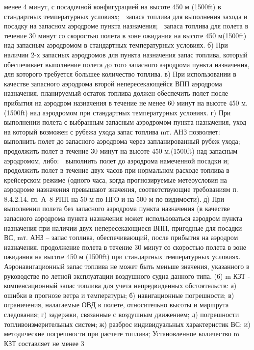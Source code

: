 менее 4 минут, с посадочной конфигурацией на высоте 450 м (1500ft) в стандартных температурных условиях;
	запаса топлива для выполнения захода и посадку на запасном аэродроме пункта назначения;
	запаса топлива для полета в течение 30 минут со скоростью полета в зоне ожидания на высоте 450 м(1500ft) над запасным аэродромом в стандартных температурных условиях.
б)	При наличии 2-х запасных аэродромов для пункта назначения запас топлива, который обеспечивает выполнение полета до того запасного аэродрома пункта назначения, для которого требуется большее количество топлива.
в)	При использовании в качестве запасного аэродрома второй непересекающейся ВПП аэродрома назначения, планируемый остаток топлива должен обеспечить полет после прибытия на аэродром назначения в течение не менее 60 минут на высоте 450 м.(1500ft) над аэродромом при стандартных температурных условиях.
г)	При выполнении полета с выбранным запасным аэродромом пункта назначения, уход на который возможен с рубежа ухода запас топлива mт. АНЗ позволяет:
	выполнить полет до запасного аэродрома через запланированный рубеж ухода;
	продолжить полет в течение 30 минут на высоте 450 м.(1500ft) над запасным аэродромом, либо:
	выполнить полет до аэродрома намеченной посадки и;
	продолжить полет в течение двух часов при нормальном расходе топлива в крейсерском режиме (одного часа, когда прогнозируемые метеоусловия на аэродроме назначения превышают значения, соответствующие требованиям п. 8.4.2.14. гл. А–8 РПП на 50 м по НГО и на 500 м по видимости).
д)	При выполнении полета без запасного аэродрома пункта назначения (в качестве запасного аэродрома пункта назначения может использоваться аэродром пункта назначения при наличии двух непересекающиеся ВПП, пригодные для посадки ВС, mт. АНЗ – запас топлива, обеспечивающий, после прибытия на аэродром назначения, продолжение полета в течение 30 минут со скоростью полета в зоне ожидания на высоте 450 м (1500ft) при стандартных температурных условиях. 
Аэронавигационный запас топлива не может быть меньше значения, указанного в руководстве по летной эксплуатации воздушного судна данного типа. 
(6) m КЗТ - компенсационный запас топлива для учета непредвиденных обстоятельств:
а)	ошибки в прогнозе ветра и температуры;
б)	навигационные погрешности;
в)	ограничения, налагаемые ОВД в полете, относительно высоты и маршрута следования;
г)	задержки, связанные с воздушным движением;
д)	погрешности топливоизмерительных систем;
ж)  разброс индивидуальных характеристик ВС;
и)  методические погрешности при расчете топлива;
Установленное количество m КЗТ составляет не менее 3%
